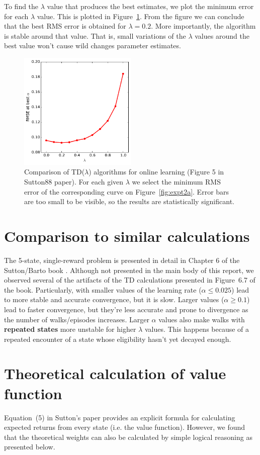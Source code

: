 \documentclass[conference]{IEEEtran}
\begin{document}
To find the $\lambda$ value that produces the best estimates, we plot the minimum error for each $\lambda$ value. This is plotted in Figure~\ref{fig:expt2b}. From the figure we can conclude that the best RMS error is obtained for $\lambda=0.2$. More importantly, the algorithm is stable around that value. That is, small variations of the $\lambda$ values around the best value won't cause wild changes parameter estimates. 
\begin{figure}[!bt]
\includegraphics[width=0.5\textwidth]{./figures/fig5.pdf}
\caption{Comparison of TD($\lambda$) algorithms for online learning (Figure 5 in Sutton88 paper). For each given $\lambda$ we select the minimum RMS error of the corresponding curve on Figure~\ref{fig:expt2a}. Error bars are too small to be visible, so the results are statistically significant.\label{fig:expt2b}}
\end{figure}
\section{Comparison to similar calculations}
The 5-state, single-reward problem is presented in detail in Chapter 6 of the Sutton/Barto book \cite{suttonbarto}. Although not presented in the main body of this report, we observed several of the artifacts of the TD calculations presented in Figure~6.7 of the book. Particularly, with smaller values of the learning rate ($\alpha \leq0.025$) lead to more stable and accurate convergence, but it is slow. Larger values ($\alpha\geq0.1$) lead to faster convergence, but they're less accurate and prone to divergence as the number of walks/episodes increases. Larger $\alpha$ values also make walks with {\bf repeated states} more unstable for higher $\lambda$ values. This happens because of a repeated encounter of a state whose eligibility hasn't yet decayed enough. 
\section{Theoretical calculation of value function}
Equation~(5) in Sutton's paper provides an explicit formula for calculating expected returns from every state (i.e. the value function). However, we found that the theoretical weights can also be calculated by simple logical reasoning as presented below. 
\end{document}
